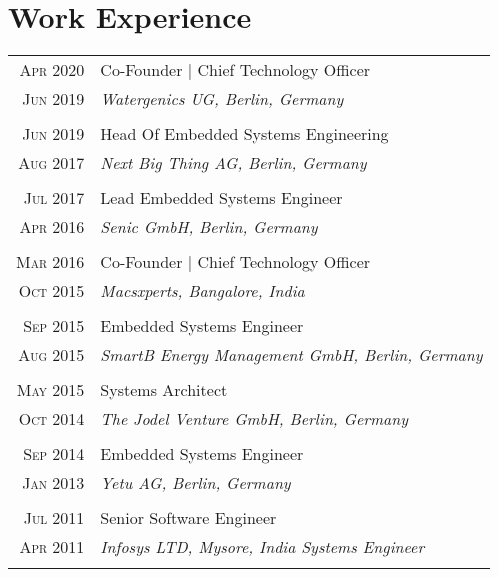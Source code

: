\section{Work Experience}
\begin{longtable}
	{r|p{12cm}}

	\textsc{Apr 2020} & Co-Founder | Chief Technology Officer\\
	\textsc{Jun 2019}&\emph{Watergenics UG, Berlin, Germany	}\\
	\multicolumn{2}{c}{} \\

	\textsc{Jun 2019} & Head Of Embedded Systems Engineering\\
	\textsc{Aug 2017}&\emph{Next Big Thing AG, Berlin, Germany}\\
	\multicolumn{2}{c}{} \\

	\textsc{Jul 2017} & Lead Embedded Systems Engineer\\
	\textsc{Apr 2016}&\emph{Senic GmbH, Berlin, Germany}\\
	\multicolumn{2}{c}{} \\

	\textsc{Mar 2016} & Co-Founder | Chief Technology Officer\\
	\textsc{Oct 2015}&\emph{Macsxperts, Bangalore, India}\\
	\multicolumn{2}{c}{} \\

	\textsc{Sep 2015} & Embedded Systems Engineer\\
	\textsc{Aug 2015}&\emph{SmartB Energy Management GmbH, Berlin, Germany	}\\
	\multicolumn{2}{c}{} \\

	\textsc{May 2015} & Systems Architect\\
	\textsc{Oct 2014}&\emph{The Jodel Venture GmbH, Berlin, Germany	}\\
	\multicolumn{2}{c}{} \\

	\textsc{Sep 2014} & Embedded Systems Engineer\\
	\textsc{Jan 2013} &\emph{Yetu AG, Berlin, Germany	}\\
	\multicolumn{2}{c}{} \\

	\textsc{Jul 2011} & Senior Software Engineer \\
	\textsc{Apr 2011} &\emph{Infosys LTD, Mysore, India	Systems Engineer}\\
	\multicolumn{2}{c}{} \\


\end{longtable}
